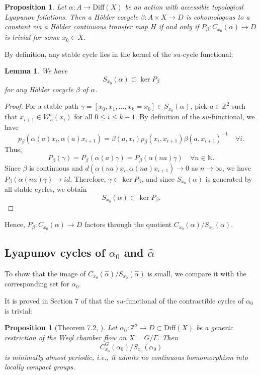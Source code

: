 \documentclass[11pt]{amsart}
\numberwithin{equation}{section}
\newcommand{\N}{\mathbb{N}}
\newcommand{\Z}{\mathbb{Z}}
\newcommand{\W}{\mathcal{W}}
\theoremstyle{plain}
\newtheorem{prop}[thm]{Proposition}
\newtheorem{lem}[thm]{Lemma}
\begin{document}
\begin{prop}\label{consttrivialfunctional}
Let $\alpha: A \to \mathrm{Diff}(X)$ be an action with accessible topological Lyapunov foliations. Then a H\"older cocycle $\beta: A \times X \to D$ is cohomologous to a constant via a H\"older continuous transfer map $H$ if and only if $P_\beta: C_{x_0}(\alpha) \to D$ is trivial for some $x_0 \in X$.
\end{prop}

By definition, any stable cycle lies in the kernel of the $su$-cycle functional:

\begin{lem}
We have 
\[
S_{x_0}(\alpha) \subset \ker P_\beta
\]
for any H\"older cocycle $\beta$ of $\alpha$.
\end{lem}

\begin{proof}
For a stable path $\gamma = [x_0, x_1, \dots, x_k = x_0] \in S_{x_0}(\alpha)$, pick $a \in \Z^2$ such that $x_{i+1} \in \W^s_a(x_i)$ for all $0 \le i \le k-1$. By definition of the $su$-functional, we have
\[
 p_\beta(\alpha(a) x_i, \alpha(a) x_{i+1}) =\beta(a,x_i) p_\beta(x_i, x_{i+1})\beta(a,x_{i+1})^{-1}  \quad \forall i.
\]
Thus,
\[
P_\beta(\gamma) = P_\beta(\alpha(a)\gamma) = P_\beta(\alpha(na)\gamma) \quad \forall n \in \N.
\]
Since $\beta$ is continuous and $d(\alpha(na)x_i, \alpha(na)x_{i+1}) \to 0$ as $n \to \infty$, we have $P_\beta(\alpha(na)\gamma) \to id$. Therefore, $\gamma \in \ker P_\beta$, and since $S_{x_0}(\alpha)$ is generated by all stable cycles, we obtain
\[
S_{x_0}(\alpha) \subset \ker P_\beta.
\]
\end{proof}

Hence, $P_\beta: C_{x_0}(\alpha) \to D$ factors through the quotient $C_{x_0}(\alpha)/S_{x_0}(\alpha)$.

\subsection{Lyapunov cycles of $\alpha_0$ and $\hat{\alpha}$}

To show that the image of $C_{x_0}(\hat{\alpha})/S_{x_0}(\hat{\alpha})$ is small, we compare it with the corresponding set for $\alpha_0$.

It is proved in Section 7 of \cite{VinWang} that the $su$-functional of the contractible cycles of $\alpha_0$ is trivial:

\begin{prop}[Theorem 7.2, \cite{VinWang}]\label{minper}
Let $\alpha_0: \Z^2 \to D \subset \mathrm{Diff}(X)$ be a generic restriction of the Weyl chamber flow on $X = G/\Gamma$. Then
\[
C^G_{x_0}(\alpha_0)/S_{x_0}(\alpha_0)
\]
is \emph{minimally almost periodic}, i.e., it admits no continuous homomorphism into locally compact groups.
\end{prop}
\end{document}
